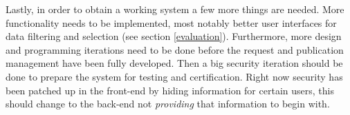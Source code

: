 Lastly, in order to obtain a working system a few more things are needed.
More functionality needs to be implemented, most notably better user interfaces for data filtering and selection (see section \ref{evaluation}).
Furthermore, more design and programming iterations need to be done before the request and publication management have been fully developed.
Then a big security iteration should be done to prepare the system for testing and certification.
Right now security has been patched up in the front-end by hiding information for certain users, this should change to the back-end not \emph{providing} that information to begin with.